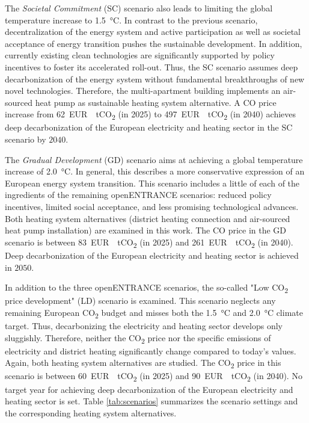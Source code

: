 The \textit{Societal Commitment} (SC) scenario also leads to limiting the global temperature increase to \SI{1.5}{\degreeCelsius}. In contrast to the previous scenario, decentralization of the energy system and active participation as well as societal acceptance of energy transition pushes the sustainable development. In addition, currently existing clean technologies are significantly supported by policy incentives to foster its accelerated roll-out. Thus, the SC scenario assumes deep decarbonization of the energy system without fundamental breakthroughs of new novel technologies. Therefore, the multi-apartment building implements an air-sourced heat pump as sustainable heating system alternative. A CO price increase from \SI{62}{EUR \per tCO_{2}} (in 2025) to \SI{497}{EUR \per tCO_{2}} (in 2040) achieves deep decarbonization of the European electricity and heating sector in the SC scenario by $2040$.\vspace{0.5cm}

The \textit{Gradual Development} (GD) scenario aims at achieving a global temperature increase of \SI{2.0}{\degreeCelsius}. In general, this describes a more conservative expression of an European energy system transition. This scenario includes a little of each of the ingredients of the remaining openENTRANCE scenarios: reduced policy incentives, limited social acceptance, and less promising technological advances. Both heating system alternatives (district heating connection and air-sourced heat pump installation) are examined in this work. The CO price in the GD scenario is between \SI{83}{EUR \per tCO_{2}} (in 2025) and \SI{261}{EUR \per tCO_{2}} (in 2040). Deep decarbonization of the European electricity and heating sector is achieved in $2050$.\vspace{0.5cm}

In addition to the three openENTRANCE scenarios, the so-called "Low CO\textsubscript{2} price development" (LD) scenario is examined. This scenario neglects any remaining European CO\textsubscript{2} budget and misses both the  \SI{1.5}{\degreeCelsius} and \SI{2.0}{\degreeCelsius} climate target. Thus, decarbonizing the electricity and heating sector develops only sluggishly. Therefore, neither the CO\textsubscript{2} price nor the specific emissions of electricity and district heating significantly change compared to today's values. Again, both heating system alternatives are studied. The CO\textsubscript{2} price in this scenario is between \SI{60}{EUR \per tCO_{2}} (in 2025) and \SI{90}{EUR \per tCO_{2}} (in 2040). No target year for achieving deep decarbonization of the European electricity and heating sector is set. Table \ref{tab:scenarios} summarizes the scenario settings and the corresponding heating system alternatives. 

